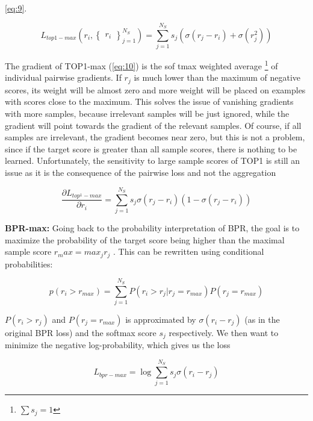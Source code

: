 \documentclass{article} %
\begin{document}
\ref{eq:9}.

\begin{equation}\label{eq:9}
    L_{top1 - max}\left ( r_i,\begin{Bmatrix}
r_i
\end{Bmatrix}_{j=1}^{N_S} \right )= \sum_{j=1}^{N_S} s_j \left ( \sigma (r_j - r_i) + \sigma (r^2_j) \right )
\end{equation}


The gradient of TOP1-max (\ref{eq:10}) is the sof tmax weighted average \footnote[7]{$\sum s_j = 1$} of individual pairwise gradients.
If $r_j$ is much lower than the maximum of negative scores, its weight will be almost zero and more
weight will be placed on examples with scores close to the maximum. This solves the issue of
vanishing gradients with more samples, because irrelevant samples will be just ignored, while the
gradient will point towards the gradient of the relevant samples. Of course, if all samples are irrelevant, the gradient becomes near zero, but this is not a problem, since if the target score is greater
than all sample scores, there is nothing to be learned. Unfortunately, the sensitivity to large sample
scores of TOP1 is still an issue as it is the consequence of the pairwise loss and not the aggregation


\begin{equation}\label{eq:10}
  \frac{\partial L_{top^1 - max}}{\partial r_i} = \sum_{j=1}^{N_S} s_j\sigma(r_j - r_i)(1 - \sigma(r_j - r_i))
  \end{equation}



\textbf{BPR-max:} Going back to the probability interpretation of BPR, the goal is to maximize the probability of the target score being higher than the maximal sample score $r_max = max_j r_j$ . This can be
rewritten using conditional probabilities:

\begin{equation}\label{eq:11}
  p\left ( r_i  > r_{max} \right ) = \sum_{j=1}^{N_S} P\left ( r_i > r_j | r_j = r_{max} \right ) P (r_j = r_{max})
  \end{equation}



$P(r_i > r_j )$ and $P(r_j = r_{max})$ is approximated by $\sigma(r_i − r_j )$ (as in the original BPR loss) and the
softmax score $s_j$ respectively. We then want to minimize the negative log-probability, which gives
us the loss

\begin{equation}\label{eq:12}
  L_{bpr-max} = \log \sum_{j=1}^{N_S} s_j \sigma (r_i - r_j)
  \end{equation}
\end{document}
